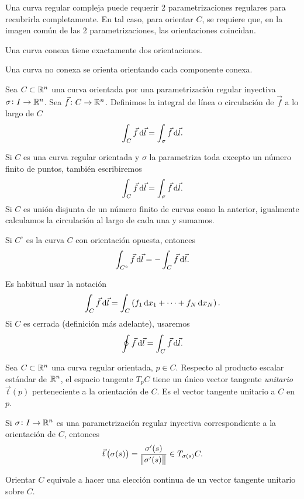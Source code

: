 \begin{obs}
    Una curva regular compleja puede requerir 2 parametrizaciones regulares para recubrirla completamente. En tal caso, para orientar $C$, se
    requiere que, en la imagen común de las 2 parametrizaciones, las orientaciones coincidan.
\end{obs}
\begin{example*}
    Una curva conexa tiene exactamente dos orientaciones.
\end{example*}
\begin{example*}
    Una curva no conexa se orienta orientando cada componente conexa.
\end{example*}

\begin{defi}
    Sea $C \subset \mathbb{R}^n$ una curva orientada por una parametrización regular inyectiva $\sigma \colon I \to \mathbb{R}^n$. Sea $\vec{f} \colon C \to \mathbb{R}^n$.
    Definimos la integral de línea o circulación de $\vec{f}$ a lo largo de $C$
    \[
        \int_C \vec{f} \dif \vec{l} = \int_\sigma \vec{f} \dif \vec{l}.
    \]
\end{defi}
\begin{obs}
    Si $C$ es una curva regular orientada y $\sigma$ la parametriza toda excepto un número finito de puntos, tambi\'en escribiremos
    \[
        \int_C \vec{f} \dif \vec{l} = \int_\sigma \vec{f} \dif \vec{l}.
    \]
    Si $C$ es unión disjunta de un número finito de curvas como la anterior, igualmente calculamos la circulación al largo de cada una y sumamos.
\end{obs}

\begin{obs}
    Si $C^\circ$ es la curva $C$ con orientación opuesta, entonces
    \[
        \int_{C^\circ} \vec{f} \dif \vec{l} = - \int_C \vec{f} \dif \vec{l}.
    \]
\end{obs}

\begin{obs}
    Es habitual usar la notación
    \[
        \int_C \vec{f} \dif \vec{l} =  \int_C \left( f_1 \dif x_1 + \cdots + f_N \dif x_N \right).
    \]
    Si $C$ es cerrada (definición más adelante), usaremos
    \[
        \oint \vec{f} \dif \vec{l} = \int_C \vec{f} \dif \vec{l}.
    \]
\end{obs}

\begin{prop}
    Sea $C \subset \mathbb{R}^n$ una curva regular orientada, $p \in C$. Respecto al producto escalar estándar de $\mathbb{R}^n$, el
    espacio tangente $T_pC$ tiene un único vector tangente \emph{unitario} $\vec{t}(p)$ perteneciente a la orientación de $C$. Es
    el vector tangente unitario a $C$ en $p$.

    Si $\sigma \colon I \to \mathbb{R}^n$ es una parametrización regular inyectiva correspondiente a la orientación de $C$, entonces
    \[
        \vec{t}\left( \sigma(s) \right) = \frac{\sigma^\prime(s)}{\norm{\sigma^\prime(s)}} \in T_{\sigma(s)}C.
    \]
\end{prop}
\begin{obs*}
    Orientar $C$ equivale a hacer una elección continua de un vector tangente unitario sobre $C$.
\end{obs*}

